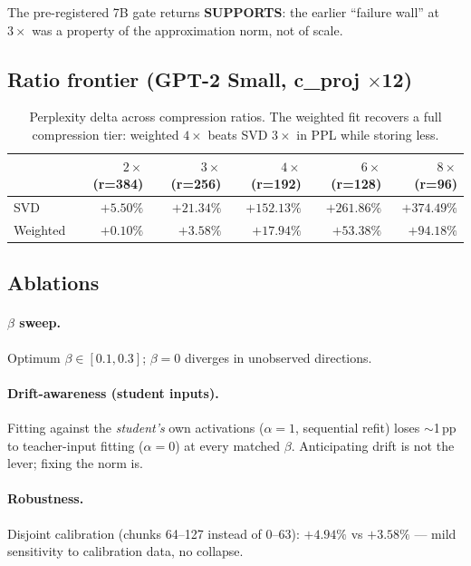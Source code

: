 \documentclass[11pt]{article}
\begin{document}
The pre-registered 7B gate returns \textbf{SUPPORTS}: the earlier
``failure wall'' at $3\times$ was a property of the approximation norm, not
of scale.

\subsection{Ratio frontier (GPT-2 Small, c\_proj $\times$12)}

\begin{table}[h]
\centering
\begin{tabular}{lrrrrr}
\toprule
& $2\times$ (r=384) & $3\times$ (r=256) & $4\times$ (r=192) & $6\times$ (r=128) & $8\times$ (r=96) \\
\midrule
SVD      & $+5.50\%$  & $+21.34\%$ & $+152.13\%$ & $+261.86\%$ & $+374.49\%$ \\
Weighted & $\mathbf{+0.10\%}$ & $\mathbf{+3.58\%}$ & $\mathbf{+17.94\%}$ & $+53.38\%$ & $+94.18\%$ \\
\bottomrule
\end{tabular}
\caption{Perplexity delta across compression ratios. The weighted fit
recovers a full compression tier: weighted $4\times$ beats SVD $3\times$ in
PPL while storing less.}
\label{tab:frontier}
\end{table}

\subsection{Ablations}\label{sec:ablations}

\paragraph{$\beta$ sweep.} Optimum $\beta \in [0.1, 0.3]$; $\beta=0$
diverges in unobserved directions.

\paragraph{Drift-awareness (student inputs).} Fitting against the
\emph{student's} own activations ($\alpha=1$, sequential refit) loses
$\sim$1\,pp to teacher-input fitting ($\alpha=0$) at every matched $\beta$.
Anticipating drift is not the lever; fixing the norm is.

\paragraph{Robustness.} Disjoint calibration (chunks 64--127 instead of
0--63): $+4.94\%$ vs $+3.58\%$ --- mild sensitivity to calibration data,
no collapse.
\end{document}
